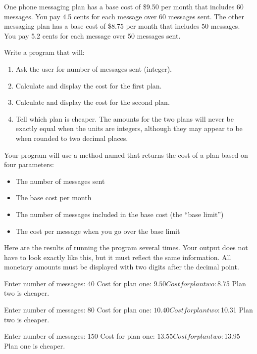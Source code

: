 \begin{exercise}
One phone messaging plan has a base cost of \$9.50 per month that includes 60 messages. You pay 4.5 cents for each message over 60 messages sent. The other messaging plan has a base cost of \$8.75 per month that includes 50 messages. You pay 5.2 cents for each message over 50 messages sent.

Write a program that will:

\begin{enumerate}
\item Ask the user for number of messages sent (integer).
\item Calculate and display the cost for the first plan.
\item Calculate and display the cost for the second plan.
\item Tell which plan is cheaper. The amounts for the two plans will never be exactly equal when the units are integers, although they may appear to be when rounded to two decimal places.
\end{enumerate}

Your program will use a method named  that returns the cost of a plan based on four parameters:
\begin{itemize}
\item The number of messages sent
\item The base cost per month
\item The number of messages included in the base cost (the ``base limit'')
\item The cost per message when you go over the base limit
\end{itemize}

Here are the results of running the program several times. Your output does not have to look exactly like this, but it must reflect the same information. All monetary amounts must be displayed with two digits after the decimal point.

\begin{stdout}
Enter number of messages: 40
Cost for plan one: $9.50
Cost for plan two: $8.75
Plan two is cheaper.

Enter number of messages: 80
Cost for plan one: $10.40
Cost for plan two: $10.31
Plan two is cheaper.

Enter number of messages: 150
Cost for plan one: $13.55
Cost for plan two: $13.95
Plan one is cheaper.
\end{stdout}

\end{exercise}

